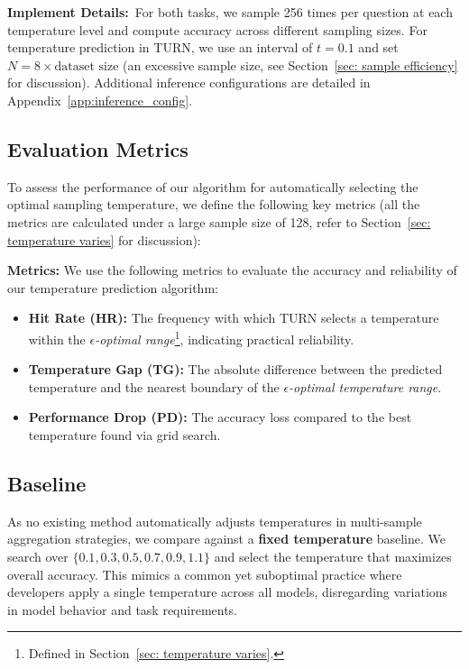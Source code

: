 \textbf{Implement Details:}\ For both tasks, we sample 256 times per question at each temperature level and compute accuracy across different sampling sizes. For temperature prediction in \textsc{TURN}, we use an interval of \( t=0.1 \) and set \( N = 8 \times \text{dataset size} \) (an excessive sample size, see Section~\ref{sec: sample efficiency} for discussion). Additional inference configurations are detailed in Appendix~\ref{app:inference_config}.


\subsection{Evaluation Metrics}

To assess the performance of our algorithm for automatically selecting the optimal sampling temperature, we define the following key metrics (all the metrics are calculated under a large sample size of 128, refer to Section~\ref{sec: temperature varies} for discussion):

\textbf{Metrics:} We use the following metrics to evaluate the accuracy and reliability of our temperature prediction algorithm:
\begin{itemize}
\item{\textbf{Hit Rate (HR):}} The frequency with which \textsc{TURN} selects a temperature within the \emph{\(\epsilon\)-optimal range}\footnote{Defined in Section~\ref{sec: temperature varies}.}, indicating practical reliability.  
\item{\textbf{Temperature Gap (TG):}} The absolute difference between the predicted temperature and the nearest boundary of the \emph{\(\epsilon\)-optimal temperature range}.
\item{\textbf{Performance Drop (PD):}} The accuracy loss compared to the best temperature found via grid search.
\end{itemize}

\subsection{Baseline}
As no existing method automatically adjusts temperatures in multi-sample aggregation strategies, we compare against a \textbf{fixed temperature} baseline. We search over \(\{0.1, 0.3, 0.5, 0.7, 0.9, 1.1\}\) and select the temperature that maximizes overall accuracy. This mimics a common yet suboptimal practice where developers apply a single temperature across all models, disregarding variations in model behavior and task requirements.  

